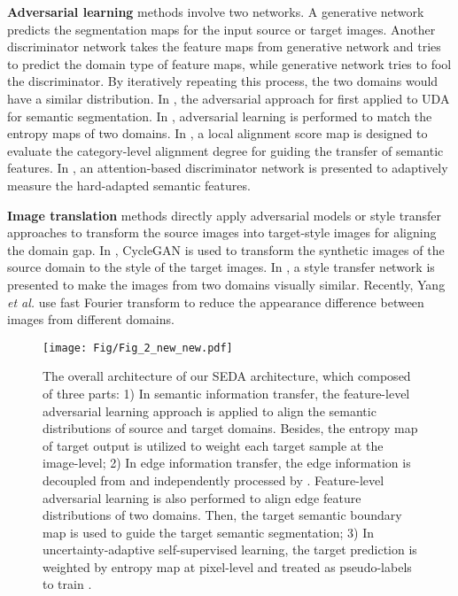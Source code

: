 \documentclass[sigconf]{acmart}
\begin{document}
\par \textbf{Adversarial learning} methods involve two networks. A generative network predicts the segmentation maps for the input source or target images. Another discriminator network takes the feature maps from generative network and tries to predict the domain type of feature maps, while generative network tries to fool the discriminator. By iteratively repeating this process, the two domains would have a similar distribution. In \cite{hoffman2016fcns}, the adversarial approach for first applied to UDA for semantic segmentation. In  \cite{vu2019advent}, adversarial learning is performed to match the entropy maps of two domains. In \cite{luo2019taking}, a local alignment score map is designed to evaluate the category-level alignment degree for guiding the transfer of semantic features. In \cite{yu2021dast}, an attention-based discriminator network is presented to adaptively measure the hard-adapted semantic features. 

\par \textbf{Image translation} methods directly apply adversarial models or style transfer approaches to transform the source images into target-style images for aligning the domain gap. In \cite{hoffman2018cycada}, CycleGAN \cite{zhu2017unpaired} is used to transform the synthetic images of the source domain to the style of the target images. In \cite{zhang2018fully}, a style transfer network is presented to make the images from two domains visually similar. Recently, Yang \emph{et al.} \cite{yang2020fda} use fast Fourier transform to reduce the appearance difference between images from different domains.   

\begin{figure*}[ht]
    \centering
    \texttt{[image: Fig/Fig\_2\_new\_new.pdf]}
    \caption{The overall architecture of our SEDA architecture, which composed of three parts: 1) In semantic information transfer, the feature-level adversarial learning approach is applied to align the semantic distributions of source and target domains. Besides, the entropy map of target output is utilized to weight each target sample at the image-level; 2) In edge information transfer, the edge information is decoupled from  and independently processed by . Feature-level adversarial learning is also performed to align edge feature distributions of two domains. Then, the target semantic boundary map is used to guide the target semantic segmentation; 3) In uncertainty-adaptive self-supervised learning, the target prediction is weighted by entropy map at pixel-level and treated as pseudo-labels to train . }
    \label{fig:2}
\end{figure*}
\end{document}
